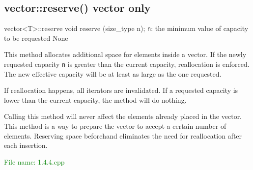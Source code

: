 
\subsection{vector::reserve() vector only} %
\begin{methodinfo}
  {vector<T>::reserve}
  {void reserve (size_type n);}
  {\texttt{n}: the minimum value of capacity to be requested}
  {None}
  {This method allocates additional space for elements inside a vector. If the newly requested capacity 
  \texttt{n} is greater than the current capacity, reallocation is enforced. The new effective capacity 
  will be at least as large as the one requested.

  If reallocation happens, all iterators are invalidated. If a requested capacity is lower than the 
  current capacity, the method will do nothing.

  Calling this method will never affect the elements already placed in the vector. This method is a 
  way to prepare the vector to accept a certain number of elements. Reserving space beforehand 
  eliminates the need for reallocation after each insertion.}
\end{methodinfo}
\textcolor{green}{File name: 1.4.4.cpp}

